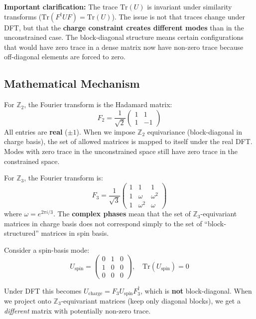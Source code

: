 \documentclass{article}
\begin{document}
\textbf{Important clarification:} The trace $\text{Tr}(U)$ is invariant under similarity transforms ($\text{Tr}(F^\dagger U F) = \text{Tr}(U)$). The issue is not that traces change under DFT, but that the \textbf{charge constraint creates different modes} than in the unconstrained case. The block-diagonal structure means certain configurations that would have zero trace in a dense matrix now have non-zero trace because off-diagonal elements are forced to zero.

\subsection{Mathematical Mechanism}

For $\mathbb{Z}_2$, the Fourier transform is the Hadamard matrix:
\begin{equation}
F_2 = \frac{1}{\sqrt{2}} \begin{pmatrix} 1 & 1 \\ 1 & -1 \end{pmatrix}
\end{equation}
All entries are \textbf{real} ($\pm 1$). When we impose $\mathbb{Z}_2$ equivariance (block-diagonal in charge basis), the set of allowed matrices is mapped to itself under the real DFT. Modes with zero trace in the unconstrained space still have zero trace in the constrained space.

For $\mathbb{Z}_3$, the Fourier transform is:
\begin{equation}
F_3 = \frac{1}{\sqrt{3}} \begin{pmatrix} 1 & 1 & 1 \\ 1 & \omega & \omega^2 \\ 1 & \omega^2 & \omega \end{pmatrix}
\end{equation}
where $\omega = e^{2\pi i/3}$. The \textbf{complex phases} mean that the set of $\mathbb{Z}_3$-equivariant matrices in charge basis does not correspond simply to the set of ``block-structured'' matrices in spin basis.

Consider a spin-basis mode:
\begin{equation}
U_{\text{spin}} = \begin{pmatrix} 0 & 1 & 0 \\ 1 & 0 & 0 \\ 0 & 0 & 0 \end{pmatrix}, \quad \text{Tr}(U_{\text{spin}}) = 0
\end{equation}

Under DFT this becomes $U_{\text{charge}} = F_3 U_{\text{spin}} F_3^\dagger$, which is \textbf{not} block-diagonal. When we project onto $\mathbb{Z}_3$-equivariant matrices (keep only diagonal blocks), we get a \textit{different} matrix with potentially non-zero trace.
\end{document}
